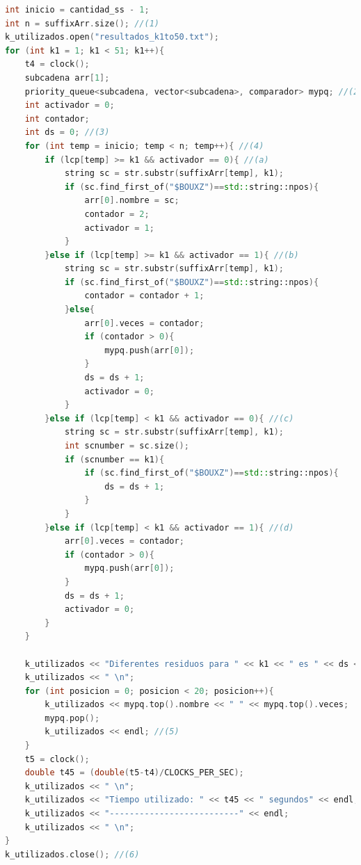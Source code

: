 \begin{lstlisting}[language=C++, caption=Obtención de los diferentes substrings de largo $k$ y los 20 substrings que más se repiten para la cadena de proteínas.]
int inicio = cantidad_ss - 1;
int n = suffixArr.size(); //(1)
k_utilizados.open("resultados_k1to50.txt");
for (int k1 = 1; k1 < 51; k1++){
    t4 = clock();
    subcadena arr[1];
    priority_queue<subcadena, vector<subcadena>, comparador> mypq; //(2)
    int activador = 0;
    int contador;
    int ds = 0; //(3)
    for (int temp = inicio; temp < n; temp++){ //(4)
        if (lcp[temp] >= k1 && activador == 0){ //(a)
            string sc = str.substr(suffixArr[temp], k1);
            if (sc.find_first_of("$BOUXZ")==std::string::npos){
                arr[0].nombre = sc;
                contador = 2;
                activador = 1;
            }
        }else if (lcp[temp] >= k1 && activador == 1){ //(b)
            string sc = str.substr(suffixArr[temp], k1);
            if (sc.find_first_of("$BOUXZ")==std::string::npos){
                contador = contador + 1;
            }else{
                arr[0].veces = contador;
                if (contador > 0){
                    mypq.push(arr[0]);
                }
                ds = ds + 1;
                activador = 0;
            }
        }else if (lcp[temp] < k1 && activador == 0){ //(c)
            string sc = str.substr(suffixArr[temp], k1);
            int scnumber = sc.size();
            if (scnumber == k1){
                if (sc.find_first_of("$BOUXZ")==std::string::npos){
                    ds = ds + 1;
                }
            }
        }else if (lcp[temp] < k1 && activador == 1){ //(d)
            arr[0].veces = contador;
            if (contador > 0){
                mypq.push(arr[0]);
            }
            ds = ds + 1;
            activador = 0;
        }
    }

    k_utilizados << "Diferentes residuos para " << k1 << " es " << ds << endl;
    k_utilizados << " \n";
    for (int posicion = 0; posicion < 20; posicion++){
        k_utilizados << mypq.top().nombre << " " << mypq.top().veces;
        mypq.pop();
        k_utilizados << endl; //(5)
    }
    t5 = clock();
    double t45 = (double(t5-t4)/CLOCKS_PER_SEC);
    k_utilizados << " \n"; 
    k_utilizados << "Tiempo utilizado: " << t45 << " segundos" << endl;
    k_utilizados << "--------------------------" << endl;
    k_utilizados << " \n";
}
k_utilizados.close(); //(6)
	
\end{lstlisting}


